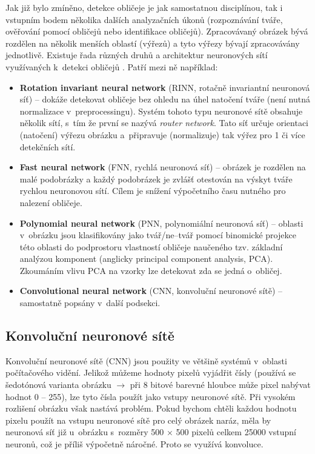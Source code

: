 Jak již bylo zmíněno, detekce obličeje je jak samostatnou disciplínou, tak i vstupním bodem několika dalších analyzačních úkonů (rozpoznávání tváře, ověřování pomocí obličejů nebo identifikace obličejů). Zpracovávaný obrázek bývá rozdělen na několik menších oblastí (výřezů) a tyto výřezy bývají zpracovávány jednotlivě. 
Existuje řada různých druhů a architektur neuronových sítí využívaných k~detekci obličejů \cite{fdReviewNS}. Patří mezi ně například:

\begin{itemize}
  \item \textbf{Rotation invariant neural network} (RINN, rotačně invariantní neuronová síť) -- dokáže detekovat obličeje bez ohledu na úhel natočení tváře (není nutná normalizace v~preprocessingu). Systém tohoto typu neuronové sítě obsahuje několik sítí, s~tím že první se nazývá \emph{router network}. Tato síť určuje orientaci (natočení) výřezu obrázku a~připravuje (normalizuje) tak výřez pro 1 či více detekčních sítí.
  \item \textbf{Fast neural network} (FNN, rychlá neuronová síť) -- obrázek je rozdělen na malé podobrázky a každý podobrázek je zvlášť otestován na výskyt tváře rychlou neuronovou sítí. Cílem je snížení výpočetního času nutného pro nalezení obličeje.
  \item \textbf{Polynomial neural network} (PNN, polynomiální neuronová síť) -- oblasti v~obrázku jsou klasifikovány jako tvář/ne--tvář pomocí binomické projekce této oblasti do podprostoru vlastností obličeje naučeného tzv. základní analýzou komponent (anglicky principal component analysis, PCA). Zkoumáním vlivu PCA na vzorky lze detekovat zda se jedná o~obličej.
  \item \textbf{Convolutional neural network} (CNN, konvoluční neuronové sítě) -- samostatně popsány v~další podsekci. 
\end{itemize}


\subsection*{Konvoluční neuronové sítě}
Konvoluční neuronové sítě (CNN) \cite{cnnNlp, cnnCv, cnnIntro} jsou použity ve většině systémů v~oblasti počítačového vidění. Jelikož můžeme hodnoty pixelů vyjádřit čísly (používá se šedotónová varianta obrázku $\rightarrow$ při 8 bitové barevné hloubce může pixel nabývat hodnot 0 -- 255), lze tyto čísla použít jako vstupy neuronové sítě. Při vysokém rozlišení obrázku však nastává problém. Pokud bychom chtěli každou hodnotu pixelu použít na vstupu neuronové sítě pro celý obrázek naráz, měla by neuronová síť již u~obrázku s~rozměry 500 $\times$ 500 pixelů celkem 25000 vstupní neuronů, což je příliš výpočetně náročné. Proto se využívá konvoluce.

